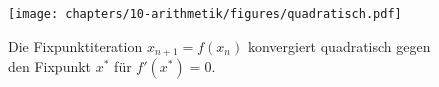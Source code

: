 %
%
%
\begin{figure}
\centering
\texttt{[image: chapters/10-arithmetik/figures/quadratisch.pdf]}
\caption{Die Fixpunktiteration $x_{n+1}=f(x_n)$ konvergiert quadratisch
gegen den Fixpunkt $x^*$
für $f'(x^*)=0$.
\label{buch:figure:fixpunkt:quadratisch}}
\end{figure}
